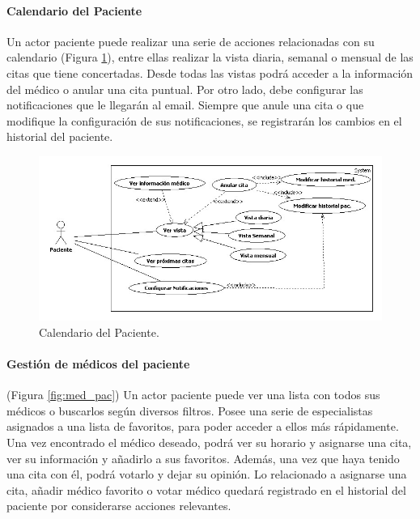 \documentclass[a4paper,oneside,11pt]{book}
\begin{document}
			\paragraph{Calendario del Paciente} %
			\label{par:calendario_del_paciente}
				Un actor paciente puede realizar una serie de acciones relacionadas con su calendario (Figura \ref{fig:cal_pac}), entre ellas realizar la vista diaria, semanal o mensual de las citas que tiene concertadas. Desde todas las vistas podrá acceder a la información del médico o anular una cita puntual. Por otro lado, debe configurar las notificaciones que le llegarán al email. Siempre que anule una cita o que modifique la configuración de sus notificaciones, se registrarán los cambios en el historial del paciente.
				\begin{figure}[H]
				  \centering
				    \includegraphics[width=14cm]{img/jpg/casos_uso/Calendario_del_paciente.jpg}
				  \caption{Calendario del Paciente.}
				  \label{fig:cal_pac}
				\end{figure}
		
			\paragraph{Gestión de médicos del paciente} %
			\label{par:gestion_de_medicos_del_paciente}
			
				(Figura \ref{fig:med_pac}) Un actor paciente puede ver una lista con todos sus médicos o buscarlos según diversos filtros. Posee una serie de especialistas asignados a una lista de favoritos, para poder acceder a ellos más rápidamente. Una vez encontrado el médico deseado, podrá ver su horario y asignarse una cita, ver su información y añadirlo a sus favoritos. Además, una vez que haya tenido una cita con él, podrá votarlo y dejar su opinión. Lo relacionado a asignarse una cita, añadir médico favorito o votar médico quedará registrado en el historial del paciente por considerarse acciones relevantes.
				
\end{document}
